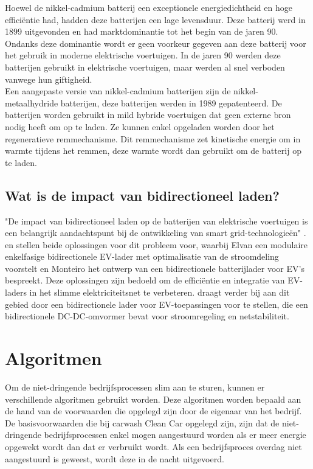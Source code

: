 Hoewel de nikkel-cadmium batterij een exceptionele energiedichtheid en hoge efficiëntie had, hadden deze batterijen een lage levensduur. Deze batterij werd in 1899 uitgevonden en had marktdominantie tot het begin van de jaren 90. Ondanks deze dominantie wordt er geen voorkeur gegeven aan deze batterij voor het gebruik in moderne elektrische voertuigen. In de jaren 90 werden deze batterijen gebruikt in elektrische voertuigen, maar werden al snel verboden vanwege hun giftigheid.\\
Een aangepaste versie van nikkel-cadmium batterijen zijn de nikkel-metaalhydride batterijen, deze batterijen werden in 1989 gepatenteerd. De batterijen worden gebruikt in mild hybride voertuigen dat geen externe bron nodig heeft om op te laden. Ze kunnen enkel opgeladen worden door het regeneratieve remmechanisme. Dit remmechanisme zet kinetische energie om in warmte tijdens het remmen, deze warmte wordt dan gebruikt om de batterij op te laden.

\subsection{Wat is de impact van bidirectioneel laden?}
\label{sec:stand-van-zaken-bidirectioneel-laden-impact}

"De impact van bidirectioneel laden op de batterijen van elektrische voertuigen is een belangrijk aandachtspunt bij de ontwikkeling van smart grid-technologieën" \autocite{Dubarry2017}. \textcite{Elvan2017} en \textcite{Monteiro2013} stellen beide oplossingen voor dit probleem voor, waarbij Elvan een modulaire enkelfasige bidirectionele EV-lader met optimalisatie van de stroomdeling voorstelt en Monteiro het ontwerp van een bidirectionele batterijlader voor EV's bespreekt. Deze oplossingen zijn bedoeld om de efficiëntie en integratie van EV-laders in het slimme elektriciteitsnet te verbeteren. \textcite{Anuja2024} draagt verder bij aan dit gebied door een bidirectionele lader voor EV-toepassingen voor te stellen, die een bidirectionele DC-DC-omvormer bevat voor stroomregeling en netstabiliteit.

\section{Algoritmen}
\label{sec:stand-van-zaken-algoritmen}

Om de niet-dringende bedrijfsprocessen slim aan te sturen, kunnen er verschillende algoritmen gebruikt worden. Deze algoritmen worden bepaald aan de hand van de voorwaarden die opgelegd zijn door de eigenaar van het bedrijf. De basisvoorwaarden die bij carwash Clean Car opgelegd zijn, zijn dat de niet-dringende bedrijfsprocessen enkel mogen aangestuurd worden als er meer energie opgewekt wordt dan dat er verbruikt wordt. Als een bedrijfsproces overdag niet aangestuurd is geweest, wordt deze in de nacht uitgevoerd.\\

